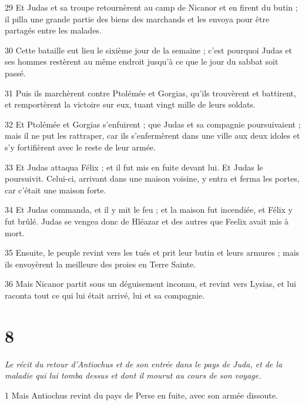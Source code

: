 \par 29 Et Judas et sa troupe retournèrent au camp de Nicanor et en firent du butin ; il pilla une grande partie des biens des marchands et les envoya pour être partagés entre les malades.

\par 30 Cette bataille eut lieu le sixième jour de la semaine ; c'est pourquoi Judas et ses hommes restèrent au même endroit jusqu'à ce que le jour du sabbat soit passé.

\par 31 Puis ils marchèrent contre Ptolémée et Gorgias, qu'ils trouvèrent et battirent, et remportèrent la victoire sur eux, tuant vingt mille de leurs soldats.

\par 32 Et Ptolémée et Gorgias s'enfuirent ; que Judas et sa compagnie poursuivaient ; mais il ne put les rattraper, car ils s'enfermèrent dans une ville aux deux idoles et s'y fortifièrent avec le reste de leur armée.

\par 33 Et Judas attaqua Félix ; et il fut mis en fuite devant lui. Et Judas le poursuivit. Celui-ci, arrivant dans une maison voisine, y entra et ferma les portes, car c'était une maison forte.

\par 34 Et Judas commanda, et il y mit le feu ; et la maison fut incendiée, et Félix y fut brûlé. Judas se vengea donc de Hléazar et des autres que Feelix avait mis à mort.

\par 35 Ensuite, le peuple revint vers les tués et prit leur butin et leurs armures ; mais ils envoyèrent la meilleure des proies en Terre Sainte.

\par 36 Mais Nicanor partit sous un déguisement inconnu, et revint vers Lysias, et lui raconta tout ce qui lui était arrivé, lui et sa compagnie.

\chapter{8}

\par \textit{Le récit du retour d'Antiochus et de son entrée dans le pays de Juda, et de la maladie qui lui tomba dessus et dont il mourut au cours de son voyage.}

\par 1 Mais Antiochus revint du pays de Perse en fuite, avec son armée dissoute.


